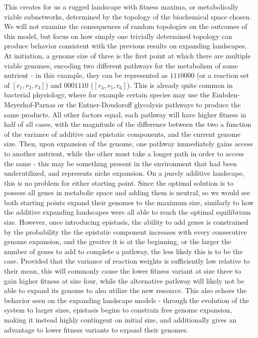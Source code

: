 \documentclass[paper=a4, fontsize=11pt,twoside]{scrartcl}       %
\begin{document}
This creates for us a rugged landscape with fitness maxima, or metabolically viable subnetworks, determined by the topology of the biochemical space chosen. We will not examine the consequences of random topologies on the outcomes of this model, but focus on how simply one trivially determined topology can produce behavior consistent with the previous results on expanding landscapes. At initiation, a genome size of three is the first point at which there are multiple viable genomes, encoding two different pathways for the metabolism of some nutrient - in this example, they can be represented as $1110000$ (or a reaction set of $[r_1, r_2, r_3]$) and $0001110$ ($[r_4, r_5, r_6]$). This is already quite common in bacterial physiology, where for example certain species may use the Embden-Meyerhof-Parnas \cite{sanchez-pascualaRefactoringEmbdenMeyerhof2017} or the Entner-Doudoroff \cite{conwayEntnerDoudoroffPathwayHistory1992} glycolysis pathways to produce the same products. All other factors equal, each pathway will have higher fitness in half of all cases, with the magnitude of the difference between the two a function of the variance of additive and epistatic components, and the current genome size. Then, upon expansion of the genome, one pathway immediately gains access to another nutrient, while the other must take a longer path in order to access the same - this may be something present in the environment that had been underutilized, and represents niche expansion. On a purely additive landscape, this is no problem for either starting point. Since the optimal solution is to possess all genes in metabolic space and adding them is neutral, so we would see both starting points expand their genomes to the maximum size, similarly to how the additive expanding landscapes were all able to reach the optimal equilibrium size. However, once introducing epistasis, the ability to add genes is constrained by the probability the the epistatic component increases with every consecutive genome expansion, and the greater it is at the beginning, or the larger the number of genes to add to complete a pathway, the less likely this is to be the case. Provided that the variance of reaction weights is sufficiently low relative to their mean, this will commonly cause the lower fitness variant at size three to gain higher fitness at size four, while the alternative pathway will likely not be able to expand its genome to also utilize the new resource. This also echoes the behavior seen on the expanding landscape models - through the evolution of the system to larger sizes, epistasis begins to constrain free genome expansion, making it instead highly contingent on initial size, and additionally gives an advantage to lower fitness variants to expand their genomes. 
\end{document}
